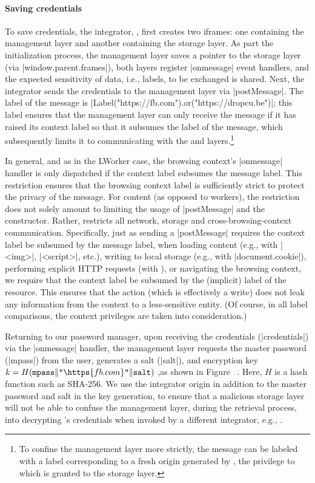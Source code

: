\paragraph{Saving credentials}
%
To save credentials, the integrator, , first creates two
iframes: one containing the  management layer and
another containing the  storage layer.
%
As part the initialization process, the management layer saves a
pointer to the storage layer (via \js|window.parent.frames|), both
layers register \js|onmessage| event handlers, and the expected
sensitivity of data, i.e., labels, to be exchanged is shared.
%
Next, the integrator sends the credentials to the management
layer via \js|postMessage|.
%
The label of the message is
\js|Label("https://fb.com").or("https://dropcu.be")|; this label
ensures that the management layer can only receive the message if it
has raised its context label so that it subsumes the label of the
message, which subsequently limits it to communicating with the
 and  layers.\footnote{
  To confine the management layer more strictly, the message can be
  labeled with a label corresponding to a fresh origin generated by
  , the privilege to which is granted to the storage
  layer. 
}

In general, and as in the LWorker case, the browsing context's
\js|onmessage| handler is only dispatched if the context label
subsumes the message label.
%
This restriction ensures that the browsing context label is
sufficiently strict to protect the privacy of the message.
%
For content (as opposed to workers), the restriction does not solely
amount to limiting the usage of \js|postMessage| and the \xhr{}
constructor.
%
Rather, \sys{} restricts all network, storage and
cross-browsing-context communication.
%
Specifically, just as sending a \js|postMessage| requires the context
label be subsumed by the message label, when loading content (e.g.,
with \js|<img>|, \js|<script>|, etc.), writing to local storage (e.g.,
with \js|document.cookie|), performing explicit HTTP requests (with
\xhr{}), or navigating the browsing context, we require that the
context label be subsumed by the (implicit) label of the resource.
%
This ensures that the action (which is effectively a write) does not
leak any information from the context to a less-sensitive entity.
%
(Of course, in all label comparisons, the context privileges are taken
into consideration.)
%
 
Returning to our password manager, upon receiving the credentials
(\js|credentials|) via the \js|onmessage| handler, the management
layer requests the master password (\js|mpass|) from the user, 
generates a salt (\js|salt|), and encryption key $k =
H(\texttt{mpass}\|\texttt{"}\https{fb.com}\texttt{"}\|\texttt{salt})$
\iffigures
,as shown in Figure~
\fi
.
%
Here, $H$ is a hash function such as SHA-256.
%
We use the integrator origin in addition to the master password and
salt in the key generation, to ensure that a malicious storage layer
will not be able to confuse the management layer, during the retrieval
process, into decrypting 's credentials when invoked by
a different integrator, e.g., .


